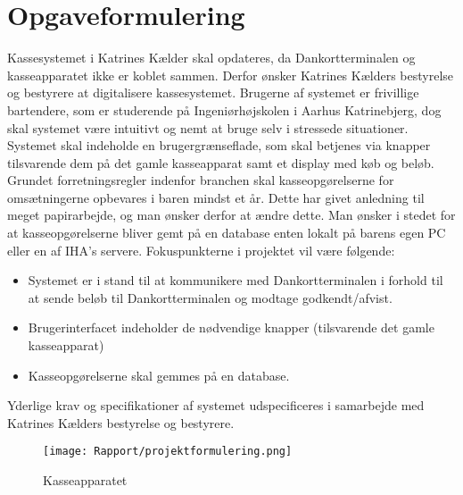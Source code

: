 \chapter{Opgaveformulering}
Kassesystemet i Katrines Kælder skal opdateres, da Dankortterminalen og kasseapparatet ikke er koblet sammen. Derfor ønsker Katrines Kælders bestyrelse og bestyrere at digitalisere kassesystemet.
\newline\newline
Brugerne af systemet er frivillige bartendere, som er studerende på Ingeniørhøjskolen i Aarhus Katrinebjerg, dog skal systemet være intuitivt og nemt at bruge selv i stressede situationer.
\newline\newline
Systemet skal indeholde en brugergrænseflade, som skal betjenes via knapper tilsvarende dem på det gamle kasseapparat samt et display med køb og beløb. 
\newline\newline
Grundet forretningsregler indenfor branchen skal kasseopgørelserne for omsætningerne opbevares i baren mindst et år. Dette har givet anledning til meget papirarbejde, og man ønsker derfor at ændre dette. Man ønsker i stedet for at kasseopgørelserne bliver gemt på en database enten lokalt på barens egen PC
eller en af \gls{IHA}’s servere.
\newline\newline
Fokuspunkterne i projektet vil være følgende:
\begin{itemize}
\item Systemet er i stand til at kommunikere med Dankortterminalen i forhold til at sende beløb til
Dankortterminalen og modtage godkendt/afvist.
\item Brugerinterfacet indeholder de nødvendige knapper (tilsvarende det gamle kasseapparat)
\item Kasseopgørelserne skal gemmes på en database.
\newline
\end{itemize}
Yderlige krav og specifikationer af systemet udspecificeres i samarbejde med Katrines Kælders bestyrelse
og bestyrere.

\begin{figure}[h]
    \centering
    \texttt{[image: Rapport/projektformulering.png]}
    \caption{Kasseapparatet}
    \label{fig:kasseapparat}
\end{figure}